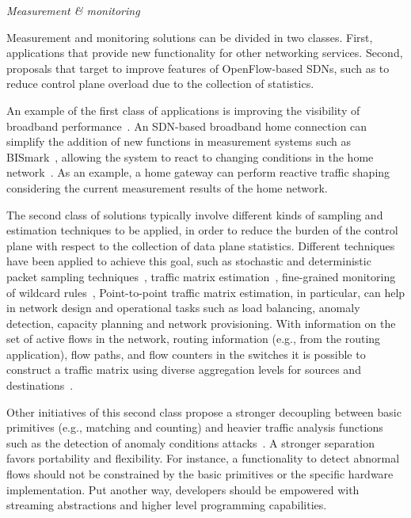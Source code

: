 \vspace{2mm}
\noindent \textit{Measurement \& monitoring}

Measurement and monitoring solutions can be divided in two classes. First, applications that provide new 
functionality for other networking services. Second, proposals that target to improve features of OpenFlow-based SDNs, 
such as to reduce control plane overload due to the collection of statistics.

An example of the first class of applications is improving the visibility of broadband 
performance~\cite{sundaresan2011,kim2013}. An SDN-based broadband home connection can 
simplify the addition of new functions in measurement systems such as BISmark~\cite{sundaresan2011}, 
allowing the system to react to changing conditions in the home network~\cite{kim2013}. As an example, a home 
gateway can perform reactive traffic shaping considering the current measurement results of the home network.

The second class of solutions typically involve different kinds of sampling and estimation 
techniques to be applied, in order to reduce the burden of the control plane with respect to the collection of data plane statistics.
Different techniques have been applied to achieve this goal, such as stochastic and deterministic packet sampling techniques~\cite{mehdi2011}, traffic matrix estimation~\cite{tootoonchian2010-1}, fine-grained monitoring of wildcard rules~\cite{wette2013}, 
Point-to-point traffic matrix estimation, in particular, can help in network design and operational tasks such as load balancing, anomaly detection, capacity planning and 
network provisioning.
With information on the set of active flows in the network, routing information (e.g., from the routing application), flow paths, and flow counters in the switches it is possible to 
construct a traffic matrix using diverse aggregation levels for sources and destinations~\cite{tootoonchian2010-1}.

Other initiatives of this second class propose a stronger decoupling between basic primitives (e.g., matching and counting) and 
heavier traffic analysis functions such as the detection of anomaly conditions attacks~\cite{bianchi2013}.
A stronger separation favors portability and flexibility.
For instance, a functionality to detect abnormal flows should not be constrained by the basic primitives or 
the specific hardware implementation.
Put another way, developers should be empowered with streaming 
abstractions and higher level programming capabilities.

